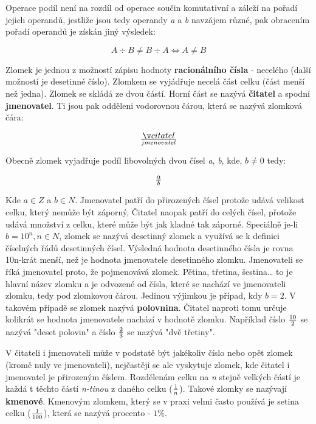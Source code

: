 
Operace podíl není na rozdíl od operace součin komutativní a záleží na pořadí jejich operandů, jestliže jsou tedy operandy {\it a} a {\it b} navzájem různé, pak obracením pořadí operandů je získán jiný výsledek:

$$ A \div B \not = B \div A \Leftrightarrow A \not = B $$


Zlomek je jednou z možností zápisu hodnoty {\bf racionálního čísla} - necelého (další možností je desetinné číslo). Zlomkem se vyjádřuje necelá část celku (část menší než jedna). Zlomek se skládá ze dvou částí. Horní část se nazývá {\bf čitatel} a spodní {\bf jmenovatel}. Ti jsou pak odděleni vodorovnou čárou, která se nazývá zlomková čára:

$$ čitatel \over jmenovatel$$

Obecně zlomek vyjadřuje podíl libovolných dvou čísel {\it a}, {\it b}, kde, $b \not = 0$ tedy:

$$ a \over b $$

Kde $a \in Z$ a $b \in N$. Jmenovatel patří do přirozených čísel protože udává velikost celku, který nemůže být záporný, Čitatel naopak patří do celých čísel, přotože udává množství z celku, které může být jak kladné tak záporné. Speciálně je-li $b = 10^n, n \in N$, zlomek se nazývá desetinný zlomek a využívá se k definici číselných řádů desetinných čísel. Výsledná hodnota desetinného čísla je rovna 10n-krát menší, než je hodnota jmenovatele desetinného zlomku. Jmenovateli se říká jmenovatel proto, že pojmenovává zlomek. Pětina, třetina, šestina… to je hlavní název zlomku a je odvozené od čísla, které se nachází ve jmenovateli zlomku, tedy pod zlomkovou čárou. Jedinou výjimkou je případ, kdy $ b = 2 $. V takovém případě se zlomek nazývá {\bf polovnina}. Čitatel naproti tomu určuje kolikrát se hodnota jmenovatele nachází v hodnotě zlomku. Například číslo $10 \over 2$ se nazývá "deset polovin" a číslo $2 \over 3$ se nazývá "dvě třetiny".

V čitateli i jmenovateli může v podstatě být jakékoliv číslo nebo opět zlomek (kromě nuly ve jmenovateli), nejčastěji se ale vyskytuje zlomek, kde čitatel i jmenovatel je přirozeným číslem. Rozdělenám celku na {\it n} stejně velkých částí je každá t těchto částí {\it n-tinou} z daného celku ($1\over n$). Takové zlomky se nazývají {\bf kmenové}. Kmenovým zlomkem, který se v praxi velmi často používá je setina celku ($1\over 100$), která se nazývá procento - $1\%$.

